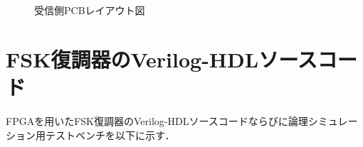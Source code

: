   \begin{figure}[p]

	\begin{center}
    \\ 
    \vspace{5mm}
    \\ 
    \caption{受信側PCBレイアウト図}
  \end{center}
\end{figure}

\chapter{FSK復調器のVerilog-HDLソースコード}
FPGAを用いたFSK復調器のVerilog-HDLソースコードならびに論理シミュレーション用テストベンチを以下に示す．

